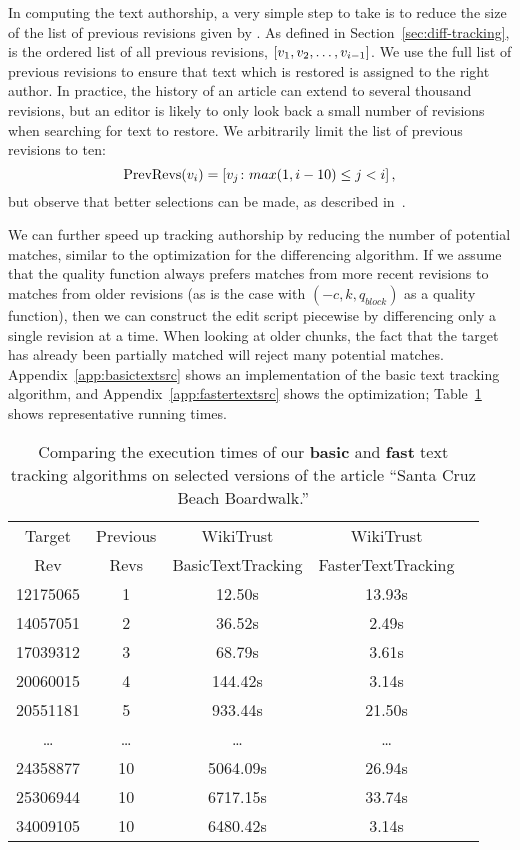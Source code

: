 In computing the text authorship,
a very simple step to take is to reduce the size of the list of
previous revisions given by .
As defined in Section~\ref{sec:diff-tracking},  
is the ordered list of all previous revisions,
$\left[ v_{1}, v_{2}, \ldots, v_{i-1} \right]$.
We use the full list of previous revisions to ensure that text which
is restored is assigned to the right author.
In practice, the history of an article can extend to several thousand
revisions, but an editor is likely to only look back a small number
of revisions when searching for text to restore.
We arbitrarily limit the list of previous revisions to ten:
\begin{equation*}
    \mathrm{PrevRevs}(v_{i}) = \left[ v_{j} \colon
	max(1,i-10) \le j < i \right],
\end{equation*}
but observe that better selections can be made, as described
in~\cite{Chatterjee2008}.

We can further speed up tracking authorship by reducing the number
of potential matches, similar to the optimization for the differencing
algorithm.
If we assume that the quality function always prefers matches from
more recent revisions to matches from older revisions
(as is the case with $(-c, k, q_{block})$ as a quality function),
then we can construct the edit script piecewise by differencing
only a single revision at a time.
When looking at older chunks, the fact that the target has already
been partially matched will reject many potential matches.
Appendix~\ref{app:basictextsrc} shows an implementation of the
basic text tracking algorithm, and Appendix~\ref{app:fastertextsrc}
shows the optimization; Table~\ref{tab:comparetext} shows representative
running times.

\begin{table}
\begin{center}
\begin{tabular}{| c | c || c || c | c |}
\hline
Target & Previous & WikiTrust & WikiTrust \\
Rev & Revs & BasicTextTracking & FasterTextTracking \\
\hline
12175065 & 1 & 12.50s & 13.93s \\
14057051 & 2 & 36.52s & 2.49s \\
17039312 & 3 & 68.79s & 3.61s \\
20060015 & 4 & 144.42s & 3.14s \\
20551181 & 5 & 933.44s & 21.50s \\
\ldots & \ldots & \ldots & \ldots \\
24358877 & 10 & 5064.09s & 26.94s \\
25306944 & 10 & 6717.15s & 33.74s \\
34009105 & 10 & 6480.42s & 3.14s \\
\hline
\end{tabular}
\end{center}
\caption[Comparing execution times of our two
    text tracking algorithms.]{Comparing the execution times of our
    \textbf{basic} and \textbf{fast} text tracking
    algorithms on selected versions of the article
    ``Santa Cruz Beach Boardwalk.''}
\label{tab:comparetext}
\end{table}



